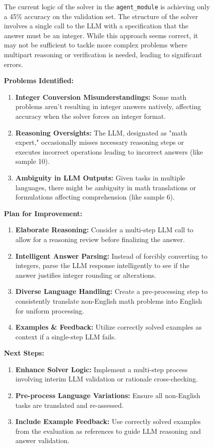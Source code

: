 \newpage
\begin{figure}[ht]
\begin{tcolorbox}[colback=black!15!white, colframe=black, title=Analysis Example of \framework]
\small
The current logic of the solver in the \texttt{agent\_module} is achieving only a 45\% accuracy on the validation set. The structure of the solver involves a single call to the LLM with a specification that the answer must be an integer. While this approach seems correct, it may not be sufficient to tackle more complex problems where multipart reasoning or verification is needed, leading to significant errors.

\textbf{Problems Identified:}
\begin{enumerate}
    \item \textbf{Integer Conversion Misunderstandings:} Some math problems aren't resulting in integer answers natively, affecting accuracy when the solver forces an integer format.
    \item \textbf{Reasoning Oversights:} The LLM, designated as "math expert," occasionally misses necessary reasoning steps or executes incorrect operations leading to incorrect answers (like sample 10).
    \item \textbf{Ambiguity in LLM Outputs:} Given tasks in multiple languages, there might be ambiguity in math translations or formulations affecting comprehension (like sample 6).
\end{enumerate}

\textbf{Plan for Improvement:}
\begin{enumerate}
    \item \textbf{Elaborate Reasoning:} Consider a multi-step LLM call to allow for a reasoning review before finalizing the answer.
    \item \textbf{Intelligent Answer Parsing:} Instead of forcibly converting to integers, parse the LLM response intelligently to see if the answer justifies integer rounding or alterations.
    \item \textbf{Diverse Language Handling:} Create a pre-processing step to consistently translate non-English math problems into English for uniform processing.
    \item \textbf{Examples \& Feedback:} Utilize correctly solved examples as context if a single-step LLM fails.
\end{enumerate}

\textbf{Next Steps:}
\begin{enumerate}
    \item \textbf{Enhance Solver Logic:} Implement a multi-step process involving interim LLM validation or rationale cross-checking.
    \item \textbf{Pre-process Language Variations:} Ensure all non-English tasks are translated and re-assessed.
    \item \textbf{Include Example Feedback:} Use correctly solved examples from the evaluation as references to guide LLM reasoning and answer validation.
\end{enumerate}


\end{tcolorbox}
\end{figure}